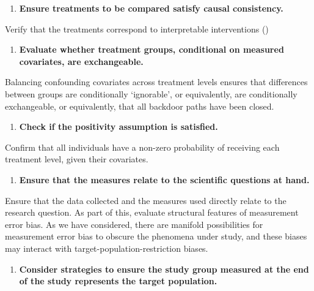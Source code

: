 \documentclass[
  single column]{article}
\providecommand{\tightlist}{%
  \setlength{\itemsep}{0pt}\setlength{\parskip}{0pt}}\usepackage{longtable,booktabs,array}
\begin{document}
\begin{enumerate}
\def\labelenumi{\arabic{enumi}.}
\setcounter{enumi}{3}
\tightlist
\item
  \textbf{Ensure treatments to be compared satisfy causal consistency.}
\end{enumerate}

Verify that the treatments correspond to interpretable interventions
()

\begin{enumerate}
\def\labelenumi{\arabic{enumi}.}
\setcounter{enumi}{4}
\tightlist
\item
  \textbf{Evaluate whether treatment groups, conditional on measured
  covariates, are exchangeable.}
\end{enumerate}

Balancing confounding covariates across treatment levels ensures that
differences between groups are conditionally `ignorable', or
equivalently, are conditionally exchangeable, or equivalently, that all
backdoor paths have been closed.

\begin{enumerate}
\def\labelenumi{\arabic{enumi}.}
\setcounter{enumi}{5}
\tightlist
\item
  \textbf{Check if the positivity assumption is satisfied.}
\end{enumerate}

Confirm that all individuals have a non-zero probability of receiving
each treatment level, given their covariates.

\begin{enumerate}
\def\labelenumi{\arabic{enumi}.}
\setcounter{enumi}{6}
\tightlist
\item
  \textbf{Ensure that the measures relate to the scientific questions at
  hand.}
\end{enumerate}

Ensure that the data collected and the measures used directly relate to
the research question. As part of this, evaluate structural features of
measurement error bias. As we have considered, there are manifold
possibilities for measurement error bias to obscure the phenomena under
study, and these biases may interact with target-population-restriction
biases.

\begin{enumerate}
\def\labelenumi{\arabic{enumi}.}
\setcounter{enumi}{7}
\tightlist
\item
  \textbf{Consider strategies to ensure the study group measured at the
  end of the study represents the target population.}
\end{enumerate}
\end{document}
